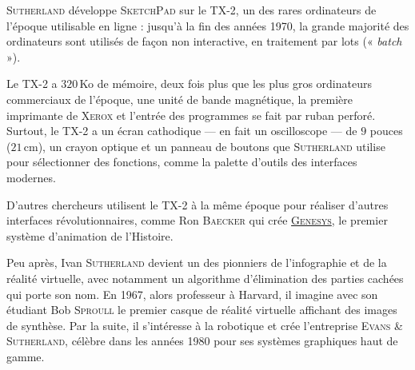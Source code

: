 \textsc{Sutherland} développe \textsc{SketchPad} sur le TX-2, un des rares ordinateurs de l'époque utilisable en ligne : jusqu'à la fin des années 1970, la grande majorité des ordinateurs sont utilisés de façon non interactive, en traitement par lots (« \textit{batch} »).

Le TX-2 a $320$\,Ko de mémoire, deux fois plus que les plus gros ordinateurs commerciaux de l'époque, une unité de bande magnétique, la première imprimante de \textsc{Xerox} et l'entrée des programmes se fait par ruban perforé. 
Surtout, le TX-2 a un écran cathodique --- en fait un oscilloscope --- de $9$ pouces ($21$\,cm), un crayon optique et un panneau de boutons que \textsc{Sutherland} utilise pour sélectionner des fonctions, comme la palette d’outils des interfaces modernes. 

D'autres chercheurs utilisent le TX-2 à la même époque pour réaliser d'autres interfaces révolutionnaires, comme Ron \textsc{Baecker} qui crée \href{https://www.youtube.com/watch?v=GYIPKLxoTcQ}{\textsc{Genesys}}, le premier système d'animation de l'Histoire.

Peu après, Ivan \textsc{Sutherland} devient un des pionniers de l'infographie et de la réalité virtuelle, avec notamment un algorithme d'élimination des parties cachées qui porte son nom. En 1967, alors professeur à Harvard, il imagine avec son étudiant Bob \textsc{Sproull} le premier casque de réalité virtuelle affichant des images de synthèse. Par la suite, il s'intéresse à la robotique et crée l'entreprise \textsc{Evans \& Sutherland}, célèbre dans les années 1980 pour ses systèmes graphiques haut de gamme.


